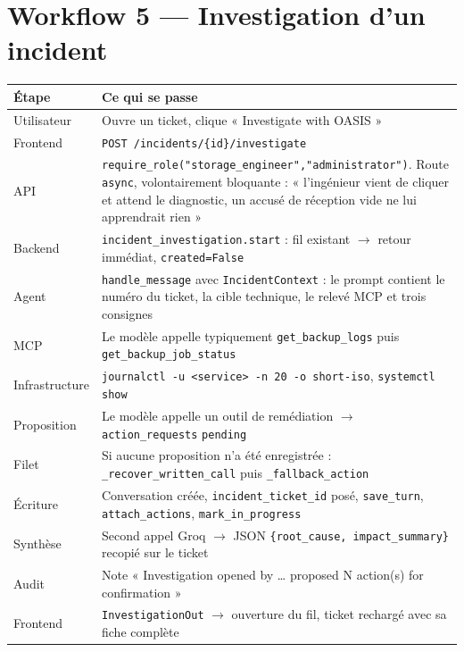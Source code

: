 \documentclass[11pt,a4paper]{report}
\newcommand{\fn}[1]{\texttt{\small\textcolor{oasisviolet}{#1}}}
\newcommand{\cls}[1]{\texttt{\small\textcolor{oasisblue}{#1}}}
\newcommand{\tbl}[1]{\texttt{\small\textcolor{oasisamber}{#1}}}
\newcommand{\route}[1]{\texttt{\small\textcolor{oasisgreen}{#1}}}
\newcommand{\arrowto}{\ensuremath{\rightarrow}}
\begin{document}
\section{Workflow 5 --- Investigation d'un incident}

\begin{longtable}{@{}p{2.9cm}p{11.9cm}@{}}
\toprule
\textbf{Étape} & \textbf{Ce qui se passe}\\
\midrule
\endhead
Utilisateur & Ouvre un ticket, clique « Investigate with OASIS »\\
Frontend & \route{POST /incidents/\{id\}/investigate}\\
API & \fn{require\_role("storage\_engineer","administrator")}. Route \texttt{async}, volontairement bloquante : « l'ingénieur vient de cliquer et attend le diagnostic, un accusé de réception vide ne lui apprendrait rien »\\
Backend & \fn{incident\_investigation.start} : fil existant \arrowto{} retour immédiat, \texttt{created=False}\\
Agent & \fn{handle\_message} avec \cls{IncidentContext} : le prompt contient le numéro du ticket, la cible technique, le relevé MCP et trois consignes\\
MCP & Le modèle appelle typiquement \fn{get\_backup\_logs} puis \fn{get\_backup\_job\_status}\\
Infrastructure & \texttt{journalctl -u <service> -n 20 -o short-iso}, \texttt{systemctl show}\\
Proposition & Le modèle appelle un outil de remédiation \arrowto{} \tbl{action\_requests} \texttt{pending}\\
Filet & Si aucune proposition n'a été enregistrée : \fn{\_recover\_written\_call} puis \fn{\_fallback\_action}\\
Écriture & Conversation créée, \texttt{incident\_ticket\_id} posé, \fn{save\_turn}, \fn{attach\_actions}, \fn{mark\_in\_progress}\\
Synthèse & Second appel Groq \arrowto{} JSON \texttt{\{root\_cause, impact\_summary\}} recopié sur le ticket\\
Audit & Note « Investigation opened by \ldots{} proposed N action(s) for confirmation »\\
Frontend & \cls{InvestigationOut} \arrowto{} ouverture du fil, ticket rechargé avec sa fiche complète\\
\bottomrule
\end{longtable}
\end{document}
